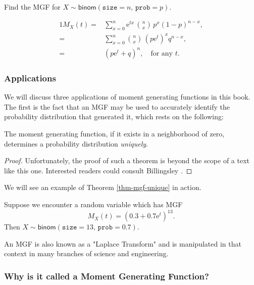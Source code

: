 Find the MGF for
\(X\sim\mathsf{binom}(\mathtt{size}=n,\,\mathtt{prob}=p)\).

\begin{alignat*}{1}
M_{X}(t)= & \sum_{x=0}^{n}\mathrm{e}^{tx}\,{n \choose x}\, p^{x}(1-p)^{n-x},\\
= & \sum_{x=0}^{n}{n \choose x}\,(p\mathrm{e}^{t})^{x}q^{n-x},\\
= & (p\mathrm{e}^{t}+q)^{n},\quad \mbox{for any $t$.}
\end{alignat*}

\subsubsection{Applications}
\label{sec-5-4-2-1}

We will discuss three applications of moment generating functions in
this book. The first is the fact that an MGF may be used to accurately
identify the probability distribution that generated it, which rests
on the following:

\begin{thm}
\label{thm-mgf-unique} The moment generating function, if it exists in a
neighborhood of zero, determines a probability distribution
\emph{uniquely}.
\end{thm}

\begin{proof}
Unfortunately, the proof of such a theorem is beyond the scope of a
text like this one. Interested readers could consult Billingsley
\cite{Billingsley1995}.
\end{proof}


We will see an example of Theorem \ref{thm-mgf-unique} in action.


Suppose we encounter a random variable which has MGF
\[
M_{X}(t)=(0.3+0.7\mathrm{e}^{t})^{13}.
\]
Then \(X\sim\mathsf{binom}(\mathtt{size}=13,\,\mathtt{prob}=0.7)\).

An MGF is also known as a "Laplace Transform" and is manipulated in
that context in many branches of science and engineering.

\subsubsection{Why is it called a Moment Generating Function?}
\label{sec-5-4-2-2}

